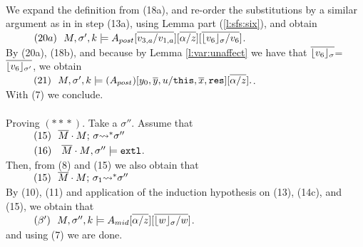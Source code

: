 \begin{description}
\\
We expand the definition from (18a), and re-order the substitutions by a similar argument as in in step (13a), using Lemma    part (\ref{l:sfs:six}), and obtain\\
$\SPS (20a) \ \  \satDAssertFrom M  {\sigma'} {k}   {A_{post}[\overline{v_{3,a}/v_{1,a}}][\overline{\alpha/z}][\overline{\interpret {\sigma} {v_6} /v_6}]}$.
\\
By  (20a),   (18b),  and because  by Lemma \ref{l:var:unaffect} we have that $\overline{\interpret {\sigma} {v_6}}$=$\overline{\interpret {\sigma'} {v_6}}$, we  obtain
\\
$\SPS (21) \ \ \satDAssertFrom M  {\sigma'} {k}   {(A_{post})[y_0,\overline y, u/\prg{this},\overline x, \prg{res}][\overline{\alpha/z}]}. $. 
\\
With (7) we conclude.\\
~ \\



 \vspace{.3cm}
Proving $(*\!*\!*)$. Take a $\sigma''$. Assume that\\
$\SPS (15) \ \ \leadstoBoundedStar   {\Mtwo\cdot M}  {\sigma}  {\sigma''}$\\
$\SPS (16) \ \ \ {\Mtwo\cdot M}, \sigma'' \models \extThis$.\\
Then, from (8) and (15) we also obtain that\\
$\SPS (15) \ \ \leadstoBoundedStar   {\Mtwo\cdot M}  {\sigma_1}  {\sigma''}$\\
By (10), (11) and application of the induction hypothesis on (13),  (14c), and (15), we obtain that\\
$\SPS (\beta') \ \  \satDAssertFrom M  {\sigma''} {k}   {A_{mid}[\overline{\alpha/z}][\overline{\interpret \sigma {w}/w}]}$.\\
and using (7) we are done.
\\
~ \\




\end{description}
